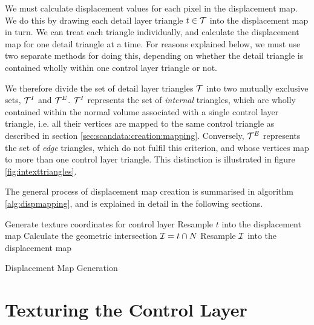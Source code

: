 We must calculate displacement values for each pixel in the displacement map. We do this by drawing each detail layer triangle $t \in {\cal T}$ into the displacement map in turn. We can treat each triangle individually, and calculate the displacement map for one detail triangle at a time. For reasons explained below, we must use two separate methods for doing this, depending on whether the detail triangle is contained wholly within one control layer triangle or not.

We therefore divide the set of detail layer triangles ${\cal T}\symbol{triset}$  into two mutually exclusive sets, ${\cal T}^I$ and ${\cal T}^E$. ${\cal T}^I$ represents the set of {\it internal} triangles, which are wholly contained within the normal volume associated with a single control layer triangle, i.e. all their vertices are mapped to the same control triangle as described in section \ref{sec:scandata:creation:mapping}. Conversely, ${\cal T}^E$ represents the set of {\it edge} triangles, which do not fulfil this criterion, and whose vertices map to more than one control layer triangle. This distinction is illustrated in figure \ref{fig:intexttriangles}.

The general process of displacement map creation is summarised in algorithm \ref{alg:dispmapping}, and is explained in detail in the following sections.

\begin{algorithm}[tbp]
\begin{algorithmic}
	\STATE Generate texture coordinates for control layer
\ENDIF
{}
		\STATE Resample $t$ into the displacement map
	\ELSE
			\STATE Calculate the geometric intersection ${\cal I} = t \cap N$
			\STATE Resample ${\cal I}$ into the displacement map
		\ENDFOR
	\ENDIF
\ENDFOR
\end{algorithmic}
\caption{\label{alg:dispmapping}Displacement Map Generation}
\end{algorithm}

\section{\label{sec:dispmapcreation:unwrap}Texturing the Control Layer}

